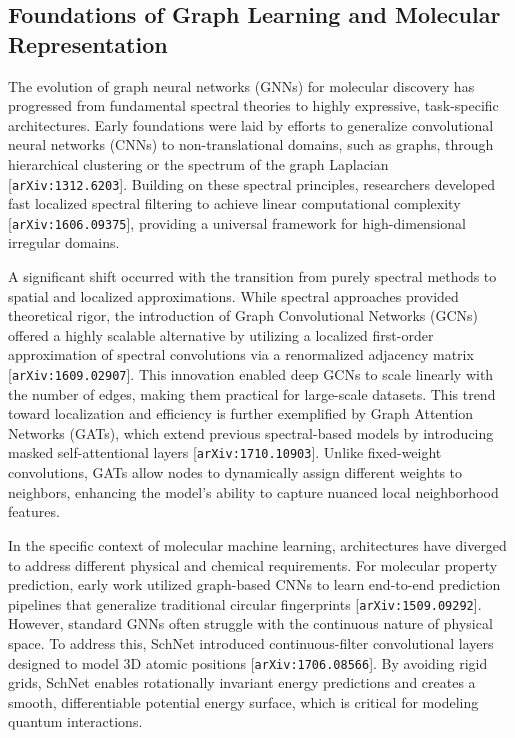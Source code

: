 \documentclass[11pt]{article}
\begin{document}
\subsection{Foundations of Graph Learning and Molecular Representation}

The evolution of graph neural networks (GNNs) for molecular discovery has progressed from fundamental spectral theories to highly expressive, task-specific architectures. Early foundations were laid by efforts to generalize convolutional neural networks (CNNs) to non-translational domains, such as graphs, through hierarchical clustering or the spectrum of the graph Laplacian [\texttt{arXiv:1312.6203}]. Building on these spectral principles, researchers developed fast localized spectral filtering to achieve linear computational complexity [\texttt{arXiv:1606.09375}], providing a universal framework for high-dimensional irregular domains.

A significant shift occurred with the transition from purely spectral methods to spatial and localized approximations. While spectral approaches provided theoretical rigor, the introduction of Graph Convolutional Networks (GCNs) offered a highly scalable alternative by utilizing a localized first-order approximation of spectral convolutions via a renormalized adjacency matrix [\texttt{arXiv:1609.02907}]. This innovation enabled deep GCNs to scale linearly with the number of edges, making them practical for large-scale datasets. This trend toward localization and efficiency is further exemplified by Graph Attention Networks (GATs), which extend previous spectral-based models by introducing masked self-attentional layers [\texttt{arXiv:1710.10903}]. Unlike fixed-weight convolutions, GATs allow nodes to dynamically assign different weights to neighbors, enhancing the model's ability to capture nuanced local neighborhood features.

In the specific context of molecular machine learning, architectures have diverged to address different physical and chemical requirements. For molecular property prediction, early work utilized graph-based CNNs to learn end-to-end prediction pipelines that generalize traditional circular fingerprints [\texttt{arXiv:1509.09292}]. However, standard GNNs often struggle with the continuous nature of physical space. To address this, SchNet introduced continuous-filter convolutional layers designed to model 3D atomic positions [\texttt{arXiv:1706.08566}]. By avoiding rigid grids, SchNet enables rotationally invariant energy predictions and creates a smooth, differentiable potential energy surface, which is critical for modeling quantum interactions.
\end{document}
